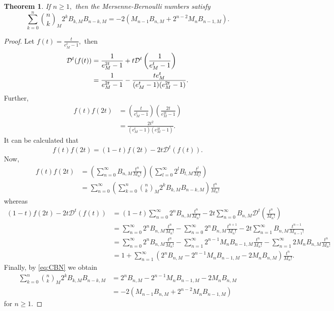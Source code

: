 \documentclass[12pt, a4paper]{article}
\newtheorem{theorem}{Theorem}[section]
\begin{document}
\begin{theorem}
If $n \geq 1,$ then the Mersenne-Bernoulli numbers satisfy 
\begin{equation*}
\sum_{k=0}^{n}\binom{n}{k}_M 2^k B_{k,M}B_{n-k,M} = -2(M_{n-1}B_{n,M}+2^{n-2}M_nB_{n-1,M}).
\end{equation*}
\end{theorem}
\begin{proof}
Let $f(t) = \frac{t}{e^t_M-1},$ then
\begin{align*}
\mathcal{D}^t(f(t))&= \frac{1}{e^{2t}_M-1}+t\mathcal{D}^t\left(\frac{1}{e^t_M-1}\right)\notag\\
&= \frac{1}{e^{2t}_M-1}-\frac{te^t_M}{(e^t_M-1)(e^{2t}_M-1)}.
\end{align*}
Further,
\begin{align*} 
f(t)f(2t) &= \left(\frac{t}{e^t_M-1}\right)\left(\frac{2t}{e^{2t}_M-1}\right)\\
&= \frac{2t^2}{(e^t_M-1)(e^{2t}_M-1)}.
\end{align*}
It can be calculated that
\begin{equation} \label{eq:CBN}
f(t)f(2t) = (1-t)f(2t)-2t\mathcal{D}^t(f(t)).
\end{equation}
Now,
\begin{align*}
f(t)f(2t) &= \left(\sum_{n=0}^{\infty}B_{n,M}\frac{t^n}{M_n!}\right)\left(\sum_{l=0}^{\infty}2^lB_{l,M}\frac{t^l}{M_l!}\right)\\
&= \sum_{n=0}^{\infty}\left(\sum_{k=0}^{n}\binom{n}{k}_M2^kB_{k,M}B_{n-k,M}\right)\frac{t^n}{M_n!}
\end{align*}
whereas
\begin{align*}
(1-t)f(2t)-2t\mathcal{D}^t(f(t)) &= (1-t)\sum_{n=0}^{\infty}2^nB_{n,M}\frac{t^n}{M_n!}-2t\sum_{n=0}^{\infty}B_{n,M}\mathcal{D}^t\left(\frac{t^n}{M_n!}\right)\\
&= \sum_{n=0}^{\infty}2^nB_{n,M}\frac{t^n}{M_n!}-\sum_{n=0}^{\infty}2^nB_{n,M}\frac{t^{n+1}}{M_n!}-2t\sum_{n=1}^{\infty}B_{n,M}\frac{t^{n-1}}{M_{n-1}!}\\
&= \sum_{n=0}^{\infty}2^nB_{n,M}\frac{t^n}{M_n!}-\sum_{n=1}^{\infty}2^{n-1}M_nB_{n-1,M}\frac{t^n}{M_n!}-\sum_{n=1}^{\infty}2M_nB_{n,M}\frac{t^n}{M_n!}\\
&= 1+\sum_{n=1}^{\infty}(2^nB_{n,M}-2^{n-1}M_nB_{n-1,M}-2M_nB_{n,M})\frac{t^n}{M_n!}.
\end{align*}
Finally, by \eqref{eq:CBN} we obtain
\begin{align*}
\sum_{k=0}^{n}\binom{n}{k}_M2^kB_{k,M}B_{n-k,M}
&= 2^nB_{n,M}-2^{n-1}M_nB_{n-1,M}-2M_nB_{n,M}\\
&= -2(M_{n-1}B_{n,M}+2^{n-2}M_nB_{n-1,M})
\end{align*}
for $n \geq 1.$
\end{proof}
\end{document}
